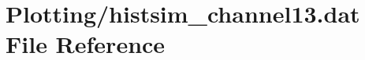\hypertarget{Plotting_2histsim__channel13_8dat}{}\section{Plotting/histsim\+\_\+channel13.dat File Reference}
\label{Plotting_2histsim__channel13_8dat}
